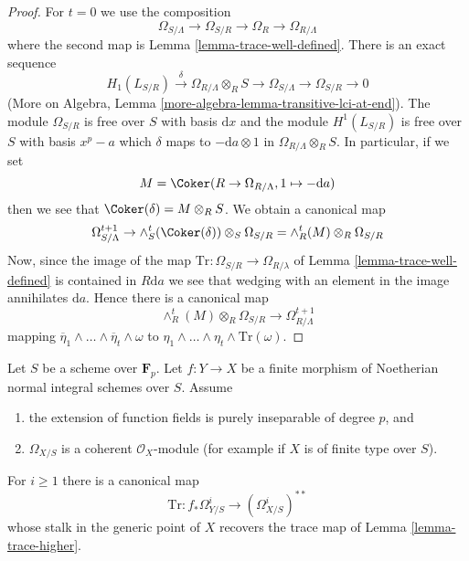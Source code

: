\begin{proof}
For $t = 0$ we use the composition
$$
\Omega_{S/\Lambda} \to \Omega_{S/R} \to \Omega_R \to \Omega_{R/\Lambda}
$$
where the second map is Lemma \ref{lemma-trace-well-defined}.
There is an exact sequence
$$
H_1(L_{S/R}) \xrightarrow{\delta} \Omega_{R/\Lambda} \otimes_R S \to
\Omega_{S/\Lambda} \to \Omega_{S/R} \to 0
$$
(More on Algebra, Lemma \ref{more-algebra-lemma-transitive-lci-at-end}).
The module $\Omega_{S/R}$ is free over $S$ with basis $\text{d}x$
and the module $H^1(L_{S/R})$ is free over $S$ with basis $x^p - a$
which $\delta$ maps to $-\text{d}a \otimes 1$ in
$\Omega_{R/\Lambda} \otimes_R S$. In particular, if we set
$$
M = \Coker(R \to \Omega_{R/\Lambda}, 1 \mapsto -\text{d}a)
$$
then we see that $\Coker(\delta) = M \otimes_R S$. We obtain a
canonical map
$$
\Omega^{t + 1}_{S/\Lambda} \to
\wedge_S^t(\Coker(\delta)) \otimes_S \Omega_{S/R} =
\wedge^t_R(M) \otimes_R \Omega_{S/R}
$$
Now, since the image of the map
$\text{Tr} : \Omega_{S/R} \to \Omega_{R/\lambda}$
of Lemma \ref{lemma-trace-well-defined} is contained in $R\text{d}a$ we
see that wedging with an element in the image annihilates $\text{d}a$.
Hence there is a canonical map
$$
\wedge^t_R(M) \otimes_R \Omega_{S/R} \to \Omega_{R/\Lambda}^{t + 1}
$$
mapping
$\overline{\eta}_1 \wedge \ldots \wedge \overline{\eta}_t \wedge \omega$
to $\eta_1 \wedge \ldots \wedge \eta_t \wedge \text{Tr}(\omega)$.
\end{proof}

\begin{lemma}
\label{lemma-trace-extends}
Let $S$ be a scheme over $\mathbf{F}_p$. Let $f : Y \to X$ be a finite morphism
of Noetherian normal integral schemes over $S$. Assume
\begin{enumerate}
\item the extension of function fields is purely inseparable of degree $p$, and
\item $\Omega_{X/S}$ is a coherent $\mathcal{O}_X$-module (for example
if $X$ is of finite type over $S$).
\end{enumerate}
For $i \geq 1$ there is a canonical map
$$
\text{Tr} : f_*\Omega^i_{Y/S} \longrightarrow (\Omega_{X/S}^i)^{**}
$$
whose stalk in the generic point of $X$ recovers the trace map of
Lemma \ref{lemma-trace-higher}.
\end{lemma}

